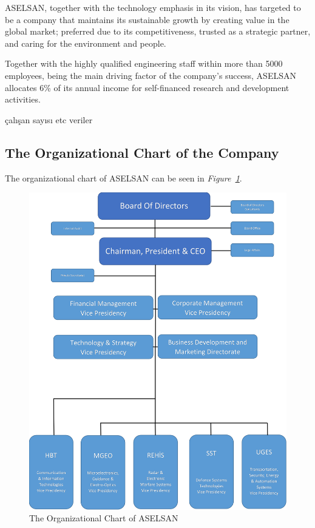 	ASELSAN, together with the technology emphasis in its vision, has targeted to be a company that maintains its sustainable growth by creating value in the global market; preferred due to its competitiveness, trusted as a strategic partner, and caring for the environment and people.

	Together with the highly qualified engineering staff within more than 5000 employees, being the main driving factor of the company's success, ASELSAN allocates 6\% of its annual income for self-financed research and development activities.
	
çalışan sayısı etc veriler 	
	
	
\vfill
\subsection{The Organizational Chart of the Company}
\-
\indent
The organizational chart of ASELSAN can be seen in \textit{Figure~\ref{fig:orgc}}.

\begin{figure}[H]
\center
\setlength{\unitlength}{\textwidth} 
\includegraphics[width=0.9\unitlength]{organizasyon4}
\caption{\label{fig:orgc}The Organizational Chart of ASELSAN }
\end{figure}

